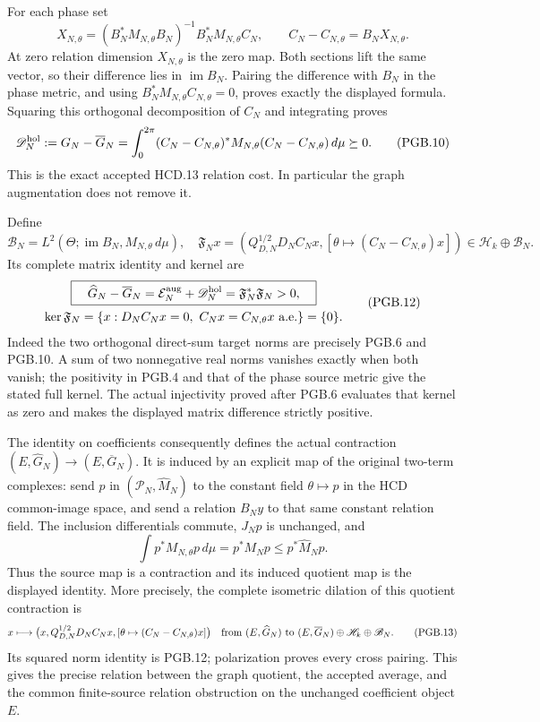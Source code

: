 \documentclass[11pt,a4paper]{article}
\theoremstyle{definition}
\begin{document}
For each phase set
\[
 X_{N,\theta}=(B_N^*M_{N,\theta}B_N)^{-1}
                          B_N^*M_{N,\theta}C_N,
 \qquad C_N-C_{N,\theta}=B_NX_{N,\theta}.
 \tag{PGB.9}\label{eq:pgb-original-relation-field}
\]
At zero relation dimension $X_{N,\theta}$ is the zero map.
Both sections lift the same vector, so their difference lies in
$\operatorname{im}B_N$. Pairing the difference with $B_N$ in
the phase metric, and using $B_N^*M_{N,\theta}C_{N,\theta}=0$,
proves exactly the displayed formula. Squaring this orthogonal
decomposition of $C_N$ and integrating proves
\[
 \mathscr D_N^{\rm hol}:=G_N-\overline G_N
 =\int_0^{2\pi}(C_N-C_{N,\theta})^*M_{N,\theta}
                      (C_N-C_{N,\theta})\,d\mu\succeq0.
 \tag{PGB.10}\label{eq:pgb-original-gap}
\]
This is the exact accepted HCD.13 relation cost. In particular
the graph augmentation does not remove it.

Define
\[
 \mathscr B_N=L^2(\Theta;\operatorname{im}B_N,
                                  M_{N,\theta}\,d\mu),
 \quad
 \mathfrak F_Nx=
 \left(Q_{D,N}^{1/2}D_NC_Nx,
       [\theta\mapsto(C_N-C_{N,\theta})x]\right)
 \in\mathscr H_k\oplus\mathscr B_N.
 \tag{PGB.11}\label{eq:pgb-full-defect-map}
\]
Its complete matrix identity and kernel are
\[
 \begin{gathered}
 \boxed{\quad
 \widehat G_N-\overline G_N
 =\mathcal E_N^{\rm aug}+\mathscr D_N^{\rm hol}
 =\mathfrak F_N^*\mathfrak F_N>0,\quad}\\
 \ker\mathfrak F_N
 =\{x:D_NC_Nx=0,\ C_Nx=C_{N,\theta}x\text{ a.e.}\}=\{0\}.
 \end{gathered}
 \tag{PGB.12}\label{eq:pgb-main-bridge}
\]
Indeed the two orthogonal direct-sum target norms are precisely
PGB.6 and PGB.10. A sum of two nonnegative real norms vanishes
exactly when both vanish; the positivity in PGB.4 and that of
the phase source metric give the stated full kernel.
The actual injectivity proved after PGB.6 evaluates that kernel
as zero and makes the displayed matrix difference strictly positive.

The identity on coefficients consequently defines the actual
contraction $(E,\widehat G_N)\to(E,\overline G_N)$. It is
induced by an explicit map of the original two-term complexes:
send $p$ in $(\mathcal P_N,\widehat M_N)$ to the constant
field $\theta\mapsto p$ in the HCD common-image space, and
send a relation $B_Ny$ to that same constant relation field.
The inclusion differentials commute, $J_Np$ is unchanged, and
\[
 \int p^*M_{N,\theta}p\,d\mu=p^*M_Np
                  \leq p^*\widehat M_Np.
\]
Thus the source map is a contraction and its induced quotient
map is the displayed identity. More precisely, the complete
isometric dilation of this quotient contraction is
\[
 x\longmapsto
 \bigl(x,Q_{D,N}^{1/2}D_NC_Nx,
             [\theta\mapsto(C_N-C_{N,\theta})x]\bigr)
 \quad\hbox{from }(E,\widehat G_N)
 \hbox{ to }(E,\overline G_N)\oplus\mathscr H_k\oplus\mathscr B_N.
 \tag{PGB.13}\label{eq:pgb-isometric-dilation}
\]
Its squared norm identity is PGB.12; polarization proves every
cross pairing. This gives the precise relation between the graph
quotient, the accepted average, and the common finite-source
relation obstruction on the unchanged coefficient object $E$.
\end{document}
